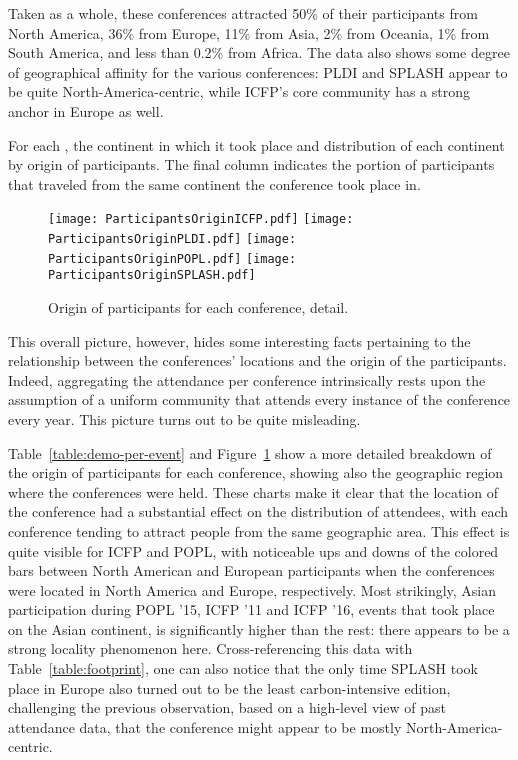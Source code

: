 Taken as a whole, these conferences attracted 50\% of their participants
from North
America, 36\% from Europe, 11\% from Asia, 2\% from Oceania, 1\% from South
America, and less than 0.2\% from Africa.
The data also shows some degree of geographical affinity for the
various conferences:
PLDI and SPLASH appear to be quite North-America-centric, while
ICFP's core community has a strong anchor in Europe as well.

\begin{table}
  \caption{For each \event, the continent in which it took place and
    distribution of
    each continent by origin of participants. The final column indicates the
    portion of participants that traveled from the same continent the
    conference took place in.}
  \label{table:demo-per-event}
\end{table}

\begin{figure}
  \centering
  \texttt{[image: ParticipantsOriginICFP.pdf]}
  \texttt{[image: ParticipantsOriginPLDI.pdf]}
  \texttt{[image: ParticipantsOriginPOPL.pdf]}
  \texttt{[image: ParticipantsOriginSPLASH.pdf]}
  \caption{Origin of participants for each conference, detail.}
  \label{fig:demo-per-event}
\end{figure}

This overall picture, however, hides some interesting facts pertaining to the
relationship between the conferences' locations and the origin of the participants.
Indeed, aggregating the attendance per conference intrinsically rests upon the
assumption of a uniform community that attends every instance of the conference
every year.  This picture turns out to be quite misleading.

Table~\ref{table:demo-per-event} and Figure~\ref{fig:demo-per-event}
show a more detailed breakdown of the origin of participants for each
conference, showing also the geographic region where the conferences were held.
%
These charts make it clear that the location of the conference had a
substantial effect on the distribution of attendees, with each conference
tending to attract people from the same geographic area. This
effect is quite visible for ICFP and POPL, with noticeable ups and downs of
the colored bars between North American and European participants when the
conferences were located in North America and Europe, respectively. Most
strikingly, Asian participation during POPL '15, ICFP '11 and ICFP '16,
events that took place on the Asian continent, is significantly higher than
the rest: there appears to be a strong locality phenomenon
here. Cross-referencing this data
with Table~\ref{table:footprint}, one can also notice that the only time
SPLASH took place in Europe also turned out to be the least carbon-intensive
edition, challenging the previous observation, based on a high-level view
of past attendance data, that the conference might appear to
be mostly North-America-centric.

